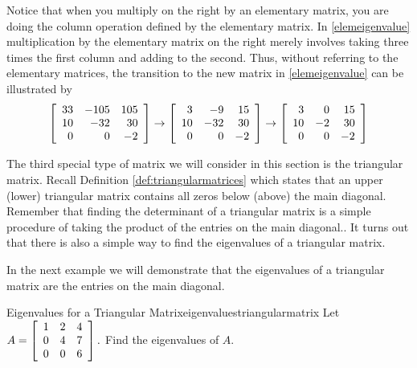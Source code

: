 Notice that when you multiply on the right by an elementary matrix,
you are doing the column operation defined by the elementary
matrix. In \ref{elemeigenvalue} multiplication by the elementary matrix on
the right merely involves taking three times the first column and
adding to the second. Thus, without referring to the elementary
matrices, the transition to the new matrix in \ref{elemeigenvalue} can be
illustrated by
\begin{equation*}
\left[
\begin{array}{rrr}
33 & -105 & 105 \\
10 & -32 & 30 \\
0 & 0 & -2
\end{array}
\right] \rightarrow \left[
\begin{array}{rrr}
3 & -9 & 15 \\
10 & -32 & 30 \\
0 & 0 & -2
\end{array}
\right] \rightarrow \left[
\begin{array}{rrr}
3 & 0 & 15 \\
10 & -2 & 30 \\
0 & 0 & -2
\end{array}
\right]
\end{equation*}

The third special type of matrix we will consider in this section is
the triangular matrix.  Recall Definition \ref{def:triangularmatrices}
which states that an upper (lower) triangular matrix contains all
zeros below (above) the main diagonal. Remember that finding the
determinant of a triangular matrix is a simple procedure of taking the product of the entries on the main diagonal.. It turns out
that there is also a simple way to find the eigenvalues of a
triangular matrix.

In the next example we will demonstrate that the eigenvalues of a 
triangular matrix are the entries on the main diagonal. 

\begin{example}{Eigenvalues for a Triangular Matrix}{eigenvaluestriangularmatrix}
Let $A=\left[
\begin{array}{rrr}
1 & 2 & 4 \\
0 & 4 & 7 \\
0 & 0 & 6
\end{array}
\right] .$ Find the eigenvalues of $A$.
\end{example}

